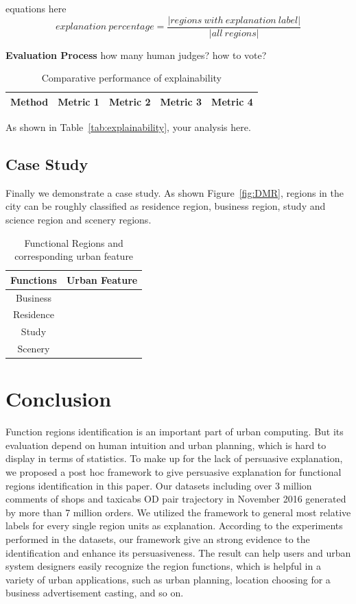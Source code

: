 \documentclass[runningheads]{llncs}
\begin{document}
equations here 
$$explanation\ percentage=\frac{|regions\ with\ explanation\ label|}{|all\ regions|}$$

\textbf{Evaluation Process}  how many human judges? how to vote?


\begin{table}[h]
\caption{Comparative performance of explainability }\label{tab:explainablity}
\begin{tabular}{|c|c|c|c|c|}
\hline
Method & Metric 1 & Metric 2 & Metric 3 & Metric 4\\\hline
\end{tabular}
\end{table}

As shown in Table~\ref{tab:explainability}, your analysis here.




\subsection{Case Study}
Finally we demonstrate a case study. As shown Figure~\ref{fig:DMR}, regions in the city can be roughly classified as residence region, business region, study and science region and scenery regions.
\begin{table}[h]
\centering
\caption{Functional Regions and corresponding urban feature}\label{dataset}
\begin{tabular}{c|c}
\hline
Functions & Urban Feature\\
\hline
Business & \\
\hline
Residence & \\
\hline
Study & \\
\hline
Scenery & \\
\hline
\end{tabular}
\end{table}






\section{Conclusion}\label{sec:conclusions}
Function regions identification is an important part of urban computing.
But its evaluation depend on human intuition and urban planning, which is hard to display in terms of statistics.
To make up for the lack of persuasive explanation, we proposed a post hoc framework to give persuasive explanation for functional regions identification in this paper.
Our datasets including over 3 million comments of shops and taxicabs OD pair trajectory in November 2016 generated by more than 7 million orders.
We utilized the framework to general most relative labels for every single region units as explanation.
According to the experiments performed in the datasets, our framework give an strong evidence to the identification and enhance its persuasiveness.
The result can help users and urban system designers easily recognize the region functions, which is helpful in a variety of urban applications, such as urban planning, location choosing for a business advertisement casting, and so on.
\end{document}
